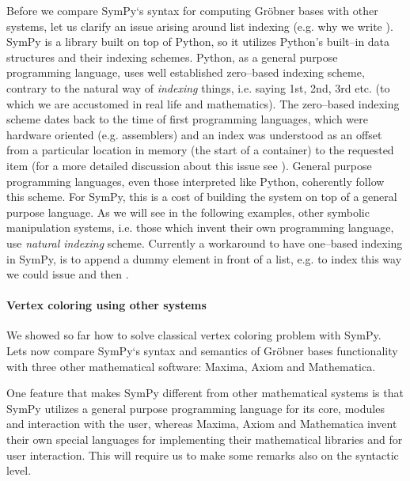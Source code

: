 Before we compare SymPy`s syntax for computing Gröbner bases with other systems, let us clarify an
issue arising around list indexing (e.g. why we write ). SymPy is a library built on top
of Python, so it utilizes Python's built--in data structures and their indexing schemes. Python, as a
general purpose programming language, uses well established zero--based indexing scheme, contrary to the
natural way of \emph{indexing} things, i.e. saying 1st, 2nd, 3rd etc. (to which we are accustomed in real life
and mathematics). The zero--based indexing scheme dates back to the time of first programming languages,
which were hardware oriented (e.g. assemblers) and an index was understood as an offset from a particular
location in memory (the start of a container) to the requested item (for a more detailed discussion about
this issue see \cite{Dijkstra1982zero}). General purpose programming languages, even those interpreted like
Python, coherently follow this scheme. For SymPy, this is a cost of building the system on top of a general
purpose language. As we will see in the following examples, other symbolic manipulation systems, i.e. those
which invent their own programming language, use \emph{natural indexing} scheme. Currently a workaround to have
one--based indexing in SymPy, is to append a dummy element in front of a list, e.g. to index  this
way we could issue  and then .


\paragraph{Vertex coloring using other systems}

We showed so far how to solve classical vertex coloring problem with SymPy. Lets now compare SymPy`s
syntax and semantics of Gröbner bases functionality with three other mathematical software: Maxima,
Axiom and Mathematica.

One feature that makes SymPy different from other mathematical systems is that SymPy utilizes a general
purpose programming language for its core, modules and interaction with the user, whereas Maxima, Axiom
and Mathematica invent their own special languages for implementing their mathematical libraries and for
user interaction. This will require us to make some remarks also on the syntactic level.

